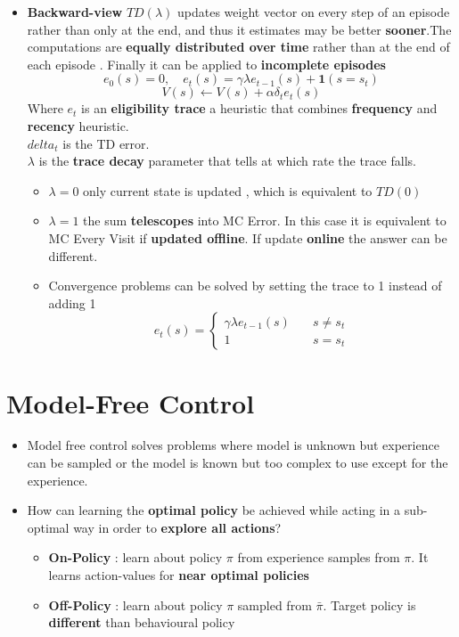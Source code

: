 \documentclass[12pt]{article} %
\begin{document}
\begin{itemize}
\begin{itemize}
\item \textbf{Backward-view} $TD(\lambda)$ updates weight vector on every step of an episode rather than only at the end, and thus it estimates may be better \textbf{sooner}.The computations are \textbf{equally distributed over time} rather than at the end of each episode . Finally it can be applied to \textbf{incomplete episodes}
$$ e_0(s) =0 ,\quad e_t(s) = \gamma \lambda e_{t-1}(s) + \bm{1}(s=s_t)$$
$$ V(s) \leftarrow V(s) + \alpha \delta_te_t(s)$$
Where $e_t$ is an \textbf{eligibility trace} a heuristic that combines \textbf{frequency} and \textbf{recency} heuristic. \\$delta_t$ is the TD error.\\
$\lambda$ is the \textbf{trace decay} parameter that tells at which rate the trace falls.
\begin{itemize}
\item $\lambda =0 $ only current state is updated , which is equivalent to $TD(0)$
\item $\lambda = 1$ the sum \textbf{telescopes} into MC Error. In this case it is equivalent to MC Every Visit if \textbf{updated offline}. If update \textbf{online} the answer can be different.

\item Convergence problems can be solved by setting the trace to 1 instead of adding 1
$$e_t(s) =
\begin{cases}
\gamma\lambda e_{t-1}(s) &\quad s \neq s_t\\
1 &\quad s = s_t
\end{cases}$$
\end{itemize}
\end{itemize}
\end{itemize}

\section{Model-Free Control}
\begin{itemize}
\item Model free control solves problems where model is unknown but experience can be sampled or the model is known but too complex to use except for the experience.

\item How can learning the \textbf{optimal policy} be achieved while acting in a sub-optimal way in order to \textbf{explore all actions}?
\begin{itemize}
\item \textbf{On-Policy} : learn about policy $\pi$ from experience samples from $\pi$. It learns action-values for \textbf{near optimal policies}
\item \textbf{Off-Policy} : learn about policy $\pi$ sampled from $\bar{\pi}$. Target policy is \textbf{different} than behavioural policy
\end{itemize}
\end{itemize}
\end{document}
